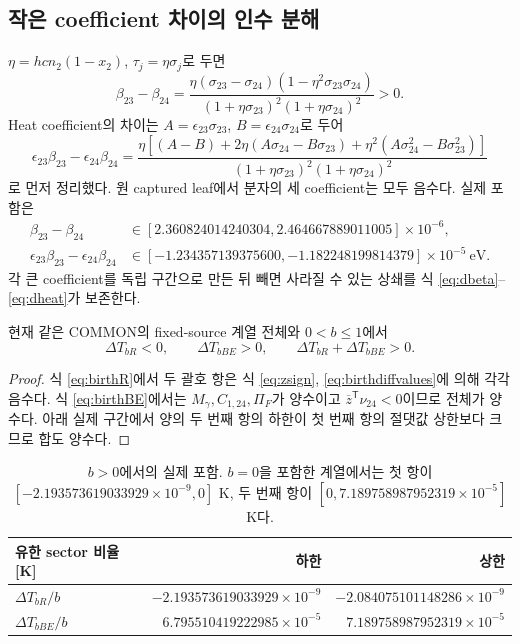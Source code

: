 \subsection{작은 coefficient 차이의 인수 분해}
$\eta=hc n_2(1-x_2)$, $\tau_j=\eta\sigma_j$로 두면
\begin{equation}
\beta_{23}-\beta_{24}
=\frac{\eta(\sigma_{23}-\sigma_{24})(1-\eta^2\sigma_{23}\sigma_{24})}
{(1+\eta\sigma_{23})^2(1+\eta\sigma_{24})^2}>0.
\label{eq:dbeta}
\end{equation}
Heat coefficient의 차이는 $A=\epsilon_{23}\sigma_{23}$, $B=\epsilon_{24}\sigma_{24}$로 두어
\begin{equation}
\epsilon_{23}\beta_{23}-\epsilon_{24}\beta_{24}
=\frac{\eta[(A-B)+2\eta(A\sigma_{24}-B\sigma_{23})
+\eta^2(A\sigma_{24}^2-B\sigma_{23}^2)]}
{(1+\eta\sigma_{23})^2(1+\eta\sigma_{24})^2}
\label{eq:dheat}
\end{equation}
로 먼저 정리했다. 원 captured leaf에서 분자의 세 coefficient는 모두 음수다. 실제 포함은
\begin{align}
\beta_{23}-\beta_{24}&\in[2.360824014240304,2.464667889011005]\times10^{-6},\\
\epsilon_{23}\beta_{23}-\epsilon_{24}\beta_{24}
&\in[-1.234357139375600,-1.182248199814379]\times10^{-5}\ \mathrm{eV}.
\label{eq:birthdiffvalues}
\end{align}
각 큰 coefficient를 독립 구간으로 만든 뒤 빼면 사라질 수 있는 상쇄를 식 \eqref{eq:dbeta}--\eqref{eq:dheat}가 보존한다.

\begin{proposition}[실제 birth 부호]\label{prop:birthsign}
현재 같은 COMMON의 fixed-source 계열 전체와 $0<b\le1$에서
\begin{equation}
\Delta T_{bR}<0,\qquad \Delta T_{bBE}>0,
\qquad \Delta T_{bR}+\Delta T_{bBE}>0.
\label{eq:birthsign}
\end{equation}
\end{proposition}
\begin{proof}
식 \eqref{eq:birthR}에서 두 괄호 항은 식 \eqref{eq:zsign}, \eqref{eq:birthdiffvalues}에 의해 각각 음수다. 식 \eqref{eq:birthBE}에서는 $M_\gamma,C_{1,24},\Pi_F$가 양수이고 $\overline z^{\mathsf T}\nu_{24}<0$이므로 전체가 양수다. 아래 실제 구간에서 양의 두 번째 항의 하한이 첫 번째 항의 절댓값 상한보다 크므로 합도 양수다.
\end{proof}

\begin{table}[H]
\centering\small
\begin{tabular}{@{}lrr@{}}
\toprule
유한 sector 비율 [K] & 하한 & 상한\\\midrule
$\Delta T_{bR}/b$ & $-2.193573619033929\times10^{-9}$ & $-2.084075101148286\times10^{-9}$\\
$\Delta T_{bBE}/b$ & $6.795510419222985\times10^{-5}$ & $7.189758987952319\times10^{-5}$\\
\bottomrule
\end{tabular}
\caption{$b>0$에서의 실제 포함. $b=0$을 포함한 계열에서는 첫 항이 $[-2.193573619033929\times10^{-9},0]$ K, 두 번째 항이 $[0,7.189758987952319\times10^{-5}]$ K다.}
\label{tab:birth}
\end{table}

